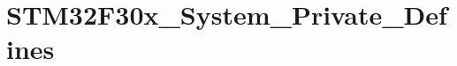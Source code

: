 \hypertarget{group___s_t_m32_f30x___system___private___defines}{\section{S\-T\-M32\-F30x\-\_\-\-System\-\_\-\-Private\-\_\-\-Defines}
\label{group___s_t_m32_f30x___system___private___defines}
}
